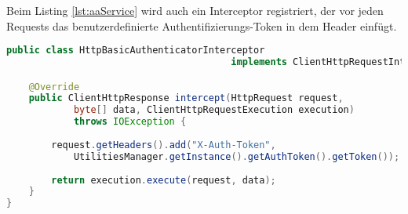 Beim Listing \ref{lst:aaService} wird auch ein Interceptor registriert, der vor jeden Requests das benutzerdefinierte Authentifizierungs-Token in dem Header einfügt.

\begin{lstlisting}[language=java, caption={Interceptor für das setzen eines zusätzlichen HTTP Header Feldes},label={lst:aaService}, escapechar=|, frame=single]
public class HttpBasicAuthenticatorInterceptor  
										implements ClientHttpRequestInterceptor {

	@Override
	public ClientHttpResponse intercept(HttpRequest request, 
			byte[] data, ClientHttpRequestExecution execution) 
			throws IOException {
					
		request.getHeaders().add("X-Auth-Token", 
			UtilitiesManager.getInstance().getAuthToken().getToken());
			
		return execution.execute(request, data);
	}
}
\end{lstlisting}